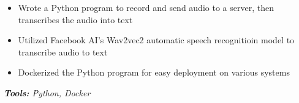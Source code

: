 \documentclass[10pt,letter]{altacv}
\begin{document}

\begin{fullwidth}
\marginpar{\makesidebarheader}
    \vspace*{-1\baselineskip}
\makecvheader
\end{fullwidth}


\begin{itemize}
  \item Wrote a Python program to record and send audio to a server, then transcribes the audio into text
  \item Utilized Facebook AI's Wav2vec2 automatic speech recognitioin model to transcribe audio to text
  \item Dockerized the Python program for easy deployment on various systems
\end{itemize}
\textit{\textbf{Tools:} Python, Docker}
\end{document}

